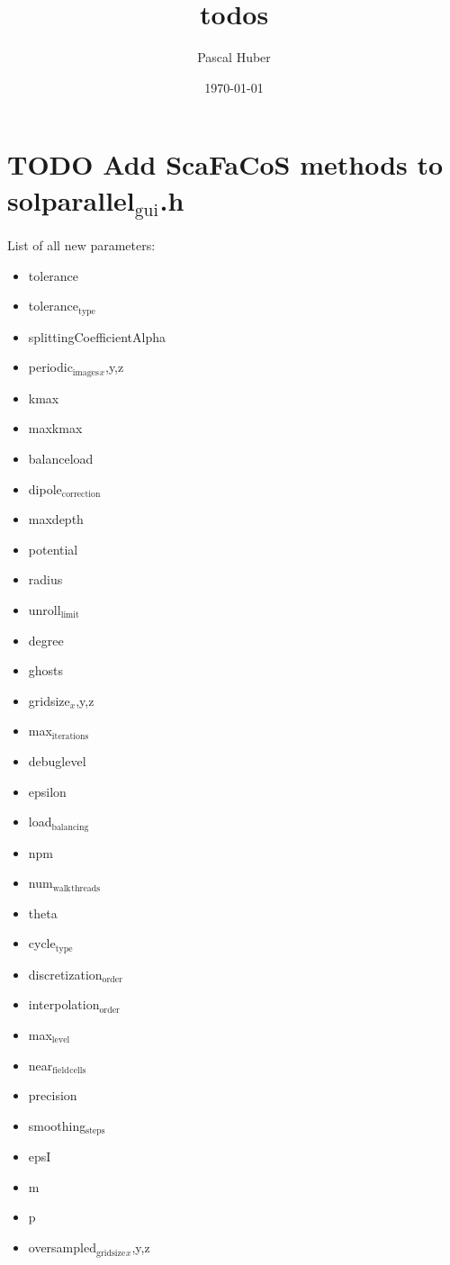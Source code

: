 \documentclass[11pt]{article}
\title{todos}
\author{Pascal Huber}
\date{\today}
\begin{document}
\maketitle

\setcounter{tocdepth}{3}
\tableofcontents
\vspace*{1cm}
\section{\textbf{TODO} Add ScaFaCoS methods to solparallel$_{\mathrm{gui}}$.h}
\label{sec-1}


List of all new parameters:
\begin{itemize}
\item tolerance
\item tolerance$_{\mathrm{type}}$
\item splittingCoefficientAlpha
\item periodic$_{\mathrm{images}}$$_x$,y,z
\item kmax
\item maxkmax
\item balanceload
\item dipole$_{\mathrm{correction}}$
\item maxdepth
\item potential
\item radius
\item unroll$_{\mathrm{limit}}$
\item degree
\item ghosts
\item gridsize$_x$,y,z
\item max$_{\mathrm{iterations}}$
\item debuglevel
\item epsilon
\item load$_{\mathrm{balancing}}$
\item npm
\item num$_{\mathrm{walk}}$$_{\mathrm{threads}}$
\item theta
\item cycle$_{\mathrm{type}}$
\item discretization$_{\mathrm{order}}$
\item interpolation$_{\mathrm{order}}$
\item max$_{\mathrm{level}}$
\item near$_{\mathrm{field}}$$_{\mathrm{cells}}$
\item precision
\item smoothing$_{\mathrm{steps}}$
\item epsI
\item m
\item p
\item oversampled$_{\mathrm{gridsize}}$$_x$,y,z
\end{itemize}
\end{document}
